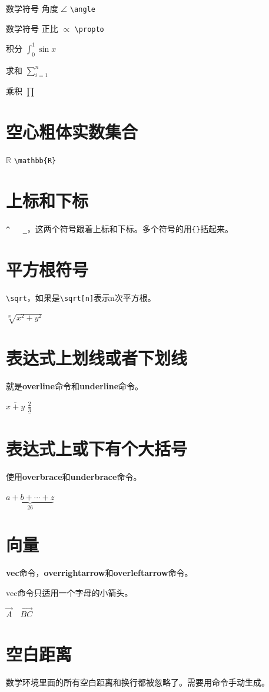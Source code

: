 \documentclass[12pt,oneside]{book}
\begin{document}
\begin{common-format}
数学符号 角度 $\angle$ \verb+\angle+

数学符号  正比  $\propto$ \verb+\propto+

积分 $\int_{0}^{1}\sin x$

求和 $\sum_{i=1}^{n}$

乘积 $\prod$





\section{空心粗体实数集合}
$\mathbb{R}$  \verb+\mathbb{R}+

\section{上标和下标}
\verb+^   _+，这两个符号跟着上标和下标。多个符号的用\verb+{}+括起来。

\section{平方根符号}
\verb+\sqrt+，如果是\verb+\sqrt[n]+表示n次平方根。

$\sqrt[n]{x^2+y^2}$

\section{表达式上划线或者下划线}
就是\textbf{overline}命令和\textbf{underline}命令。

$\overline{x+y}$  $\underline{\frac{2}{3}}$

\section{表达式上或下有个大括号}
使用\textbf{overbrace}和\textbf{underbrace}命令。

$\underbrace{ a+b+\cdots+z }_{26}$

\section{向量}
\textbf{vec}命令，\textbf{overrightarrow}和\textbf{overleftarrow}命令。

vec命令只适用一个字母的小箭头。

$\vec {A} \quad \overrightarrow{BC}$

\section{空白距离}
数学环境里面的所有空白距离和换行都被忽略了。需要用命令手动生成。


\end{common-format}
\end{document}
